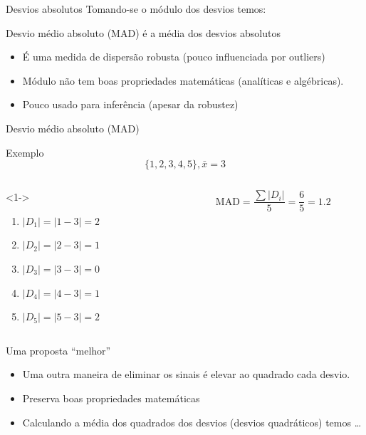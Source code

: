 \documentclass{beamer}
\begin{document}
\begin{frame}{Desvios absolutos}
  Tomando-se o módulo dos desvios temos:

  \begin{definition}
    Desvio médio absoluto (MAD) é a média dos desvios absolutos
  \end{definition}

  \begin{itemize}
  \item É uma medida de dispersão robusta (pouco influenciada por
    outliers)
  \item Módulo não tem boas propriedades matemáticas (analíticas e
    algébricas).
  \item Pouco usado para inferência (apesar da robustez)
  \end{itemize}
\end{frame}

\begin{frame}{Desvio médio absoluto (MAD)}
  \begin{exampleblock}{Exemplo}
  \begin{displaymath}
    \{1,2,3,4,5\}, \bar{x} = 3
  \end{displaymath}
  \begin{columns}
    \begin{column}{5cm}<1->
      \begin{enumerate}
      \item $|D_1| = |1-3| = 2$
      \item $|D_2| = |2-3| = 1$
      \item $|D_3| = |3-3| = 0$
      \item $|D_4| = |4-3| = 1$
      \item $|D_5| = |5-3| = 2$
      \end{enumerate}
    \end{column}
    \begin{column}{5cm}
      \begin{displaymath}
        \mathrm{MAD } = \frac{\sum |D_i|}{5} = \frac{6}{5} = 1.2
      \end{displaymath}
    \end{column}
  \end{columns}
  \end{exampleblock}
\end{frame}

\begin{frame}{Uma proposta ``melhor''}
  \begin{itemize}
  \item Uma outra maneira de eliminar os sinais é elevar ao quadrado
    cada desvio.
  \item Preserva boas propriedades matemáticas
  \item Calculando a média dos quadrados dos desvios (desvios
    quadráticos) temos \ldots
  \end{itemize}
\end{frame}
\end{document}
